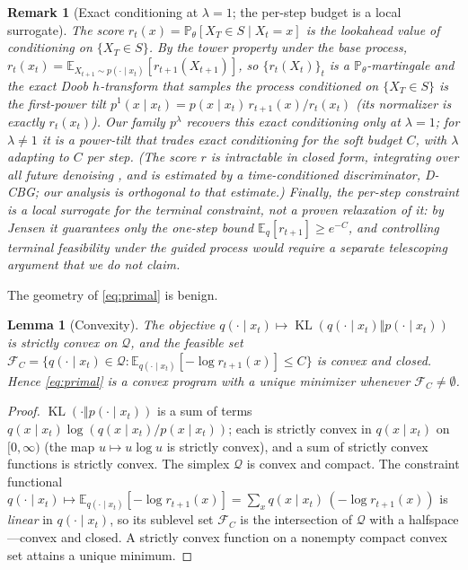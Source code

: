 \documentclass{article}
\newtheorem{lemma}{Lemma}
\newtheorem{remark}{Remark}
\DeclareMathOperator{\KL}{KL}
\newcommand{\E}{\mathbb{E}}
\newcommand{\Q}{\mathcal{Q}}
\begin{document}
\begin{remark}[Exact conditioning at $\lambda{=}1$; the per-step budget is a local surrogate]
\label{rmk:myopic}
The score $r_t(x)=\mathbb P_\theta[X_T\in S\mid X_t=x]$ is the \emph{lookahead value} of conditioning on $\{X_T\in S\}$. By the tower property under the base process, $r_t(x_t)=\E_{X_{t+1}\sim p(\cdot\mid x_t)}[r_{t+1}(X_{t+1})]$, so $\{r_t(X_t)\}_t$ is a $\mathbb P_\theta$-martingale and the exact Doob $h$-transform that samples the process conditioned on $\{X_T\in S\}$ is the \emph{first-power} tilt $p^{1}(x\mid x_t)=p(x\mid x_t)\,r_{t+1}(x)/r_t(x_t)$ (its normalizer is exactly $r_t(x_t)$). Our family $p^{\lambda}$ recovers this exact conditioning \emph{only} at $\lambda=1$; for $\lambda\neq1$ it is a power-tilt that trades exact conditioning for the soft budget $C$, with $\lambda$ adapting to $C$ per step. (The score $r$ is intractable in closed form, integrating over all future denoising \cite{wu2023practical,zhao2024probabilistic}, and is estimated by a time-conditioned discriminator, D-CBG; our analysis is orthogonal to that estimate.) Finally, the per-step constraint is a \emph{local surrogate} for the terminal constraint, not a proven relaxation of it: by Jensen it guarantees only the one-step bound $\E_{q}[r_{t+1}]\ge e^{-C}$, and controlling terminal feasibility under the \emph{guided} process would require a separate telescoping argument that we do not claim.
\end{remark}

The geometry of \eqref{eq:primal} is benign.

\begin{lemma}[Convexity]
\label{lem:convex}
The objective $q(\cdot\mid x_t)\mapsto\KL(q(\cdot\mid x_t)\Vert p(\cdot\mid x_t))$ is strictly convex on $\Q$, and the feasible set
$\mathcal{F}_C=\{q(\cdot\mid x_t)\in\Q:\E_{q(\cdot\mid x_t)}[-\log r_{t+1}(x)]\le C\}$ is convex and closed. Hence \eqref{eq:primal} is a convex program with a unique minimizer whenever $\mathcal{F}_C\neq\emptyset$.
\end{lemma}
\begin{proof}
$\KL(\cdot\Vert p(\cdot\mid x_t))$ is a sum of terms $q(x\mid x_t)\log(q(x\mid x_t)/p(x\mid x_t))$; each is strictly convex in $q(x\mid x_t)$ on $[0,\infty)$ (the map $u\mapsto u\log u$ is strictly convex), and a sum of strictly convex functions is strictly convex. The simplex $\Q$ is convex and compact. The constraint functional $q(\cdot\mid x_t)\mapsto\E_{q(\cdot\mid x_t)}[-\log r_{t+1}(x)]=\sum_x q(x\mid x_t)\,(-\log r_{t+1}(x))$ is \emph{linear} in $q(\cdot\mid x_t)$, so its sublevel set $\mathcal{F}_C$ is the intersection of $\Q$ with a halfspace---convex and closed. A strictly convex function on a nonempty compact convex set attains a unique minimum.
\end{proof}
\end{document}
